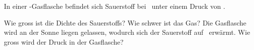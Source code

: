 In einer \VOO-Gasflasche befindet sich Sauerstoff bei \thEiO\ unter einem Druck von \pEiO.
\begin{abcliste}
\abc Wie gross ist die Dichte des Sauerstoffs?
\abc Wie schwer ist das Gas?
\abc Die Gasflasche wird an der Sonne liegen gelassen, wodurch sich der Sauerstoff auf \thZwO\ erwärmt. Wie gross wird der Druck in der Gasflasche?
\end{abcliste}
